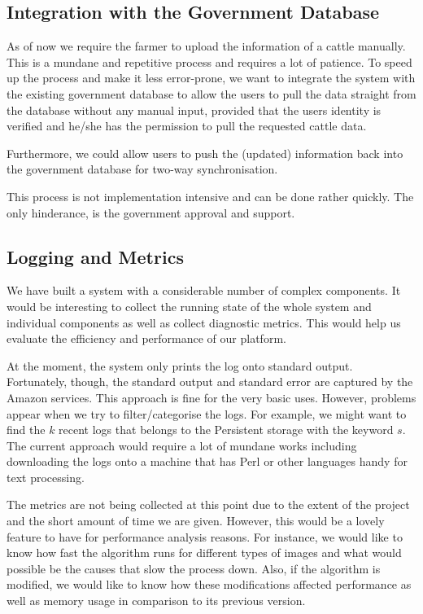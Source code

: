 \subsection{Integration with the Government Database}

As of now we require the farmer to upload the information of a cattle manually. This is a mundane and repetitive process and requires a lot of patience. To speed up the process and make it less error-prone, we want to integrate the system with the existing government database to allow the users to pull the data straight from the database without any manual input, provided that the users identity is verified and he/she has the permission to pull the requested cattle data.

Furthermore, we could allow users to push the (updated) information back into the government database for two-way synchronisation.

This process is not implementation intensive and can be done rather quickly. The only hinderance, is the government approval and support.

\subsection{Logging and Metrics}

We have built a system with a considerable number of complex components. It would be interesting to collect the running state of the whole system and individual components as well as collect diagnostic metrics. This would help us evaluate the efficiency and performance of our platform.

At the moment, the system only prints the log onto standard output. Fortunately, though, the standard output and standard error are captured by the Amazon services. This approach is fine for the very basic uses. However, problems appear when we try to filter/categorise the logs. For example, we might want to find the $k$ recent logs that belongs to the Persistent storage with the keyword $s$. The current approach would require a lot of mundane works including downloading the logs onto a machine that has Perl or other languages handy for text processing.

The metrics are not being collected at this point due to the extent of the project and the short amount of time we are given. However, this would be a lovely feature to have for performance analysis reasons. For instance, we would like to know how fast the algorithm runs for different types of images and what would possible be the causes that slow the process down. Also, if the algorithm is modified, we would like to know how these modifications affected performance as well as memory usage in comparison to its previous version.

